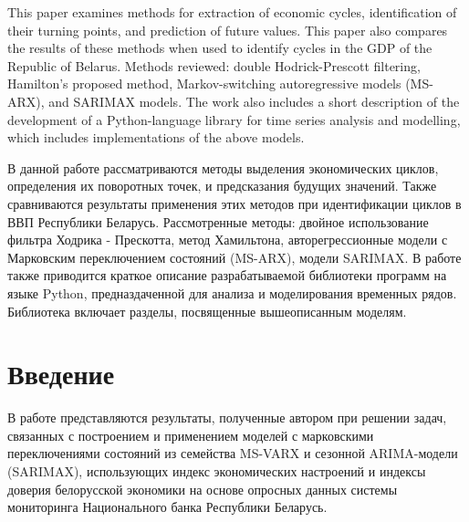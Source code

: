 \documentclass[a4paper,14pt]{extreport}
\begin{document}
	\maketitle
	

	\clearpage
	
	\renewcommand{\contentsname}{Содержание}
	\tableofcontents
	
	\clearpage
	
	\bsuabstract
	{
		This paper examines methods for extraction of economic cycles, identification of their turning points, and prediction of future values. This paper also compares the results of these methods when used to identify cycles in the GDP of the Republic of Belarus. Methods reviewed: double Hodrick-Prescott filtering, Hamilton's proposed method,  Markov-switching autoregressive models (MS-ARX), and SARIMAX models. The work also includes a short description of the development of a Python-language library for time series analysis and modelling, which includes implementations of the above models.
		
	}{
		В данной работе рассматриваются методы выделения экономических циклов, определения их поворотных точек, и предсказания будущих значений. Также сравниваются результаты применения этих методов при идентификации циклов в ВВП Республики Беларусь. Рассмотренные методы: двойное использование фильтра Ходрика - Прескотта, метод Хамильтона, авторегрессионные модели с Марковским переключением состояний (MS-ARX), модели SARIMAX. В работе также приводится краткое описание разрабатываемой библиотеки программ на языке Python, предназдаченной для анализа и моделирования временных рядов. Библиотека включает разделы, посвященные вышеописанным моделям.
	}
	
	\clearpage
				
	
	\chapter*{Введение}
	В работе представляются результаты, полученные автором при решении задач, связанных с построением и применением моделей с марковскими переключениями состояний из семейства MS-VARX и сезонной ARIMA-модели (SARIMAX), использующих индекс экономических настроений и индексы доверия белорусской экономики на основе опросных данных системы мониторинга Национального банка Республики Беларусь.
	
	
\end{document}
